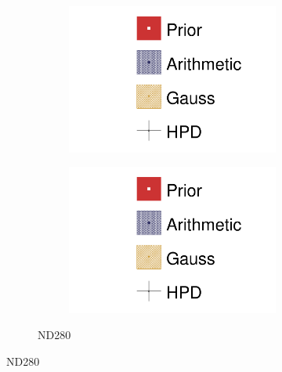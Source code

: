 \begin{figure}[h]
\begin{subfigure}[t]{\textwidth}
\begin{subfigure}[t]{0.24\textwidth}
		\includegraphics[width=\textwidth,page=8, trim={0mm 0mm 0mm 9mm}, clip]{figures/mach3/2018/asimov/2018a_MultiPi_Binningv6_NewCov_Asimov_NoDet_merge_drawPar}
	\end{subfigure}
	\begin{subfigure}[t]{0.24\textwidth}
		\includegraphics[width=\textwidth,page=9, trim={0mm 0mm 0mm 9mm}, clip]{figures/mach3/2018/asimov/2018a_MultiPi_Binningv6_NewCov_Asimov_NoDet_merge_drawPar}
	\end{subfigure}
\caption{ND280}
\end{subfigure}


\end{figure}
